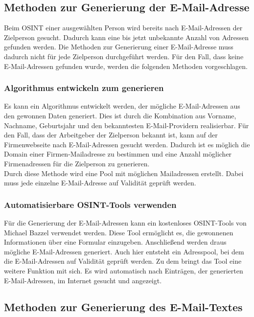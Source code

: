 	\subsection{Methoden zur Generierung der E-Mail-Adresse}
	
	Beim OSINT einer ausgewählten Person wird bereits nach E-Mail-Adressen der Zielperson gesucht. Dadurch kann eine bis jetzt unbekannte Anzahl von Adressen gefunden werden. Die Methoden zur Generierung einer E-Mail-Adresse muss dadurch nicht für jede Zielperson durchgeführt werden. Für den Fall, dass keine E-Mail-Adressen gefunden wurde, werden die folgenden Methoden vorgeschlagen.
	
		\subsubsection{Algorithmus entwickeln zum generieren}
		Es kann ein Algorithmus entwickelt werden, der mögliche E-Mail-Adressen aus den gewonnen Daten generiert. Dies ist durch die Kombination aus Vorname, Nachname, Geburtsjahr und den bekanntesten E-Mail-Providern realisierbar. Für den Fall, dass der Arbeitgeber der Zielperson bekannt ist, kann auf der Firmenwebseite nach E-Mail-Adressen gesucht werden. Dadurch ist es möglich die Domain einer Firmen-Mailadresse zu bestimmen und eine Anzahl möglicher Firmenadressen für die Zielperson zu generieren.\\
		Durch diese Methode wird eine Pool mit möglichen Mailadressen erstellt. Dabei muss jede einzelne E-Mail-Adresse auf Validität geprüft werden.
		
		\subsubsection{Automatisierbare OSINT-Tools verwenden}
		Für die Generierung der E-Mail-Adressen kann ein kostenloses OSINT-Tools von Michael Bazzel verwendet werden. Diese Tool ermöglicht es, die gewonnenen Informationen über eine Formular einzugeben. Anschließend werden draus mögliche E-Mail-Adressen generiert. Auch hier entsteht ein Adresspool, bei dem die E-Mail-Adressen auf Validität geprüft werden. Zu dem bringt das Tool eine weitere Funktion mit sich. Es wird automatisch nach Einträgen, der generierten E-Mail-Adressen, im Internet gesucht und angezeigt. \cite{EmailAssumptions}
		
	\subsection{Methoden zur Generierung des E-Mail-Textes}
